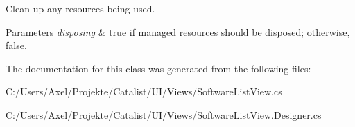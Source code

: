 Clean up any resources being used. 


\begin{DoxyParams}{Parameters}
{\em disposing} & true if managed resources should be disposed; otherwise, false.\\
\hline
\end{DoxyParams}


The documentation for this class was generated from the following files\+:\begin{DoxyCompactItemize}
\item 
C\+:/\+Users/\+Axel/\+Projekte/\+Catalist/\+U\+I/\+Views/Software\+List\+View.\+cs\item 
C\+:/\+Users/\+Axel/\+Projekte/\+Catalist/\+U\+I/\+Views/Software\+List\+View.\+Designer.\+cs\end{DoxyCompactItemize}
